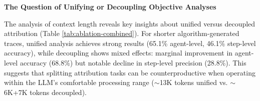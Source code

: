 \documentclass{article}
\begin{document}
\textbf{The Question of Unifying or Decoupling Objective Analyses}




The analysis of context length reveals key insights about unified versus decoupled attribution (Table \ref{tab:ablation-combined}). For shorter algorithm-generated traces, unified analysis achieves strong results (65.1\% agent-level, 46.1\% step-level accuracy), while decoupling shows mixed effects: marginal improvement in agent-level accuracy (68.8\%) but notable decline in step-level precision (28.8\%). This suggests that splitting attribution tasks can be counterproductive when operating within the LLM's comfortable processing range ($\sim$13K tokens unified vs. $\sim$6K+7K tokens decoupled).
\end{document}
